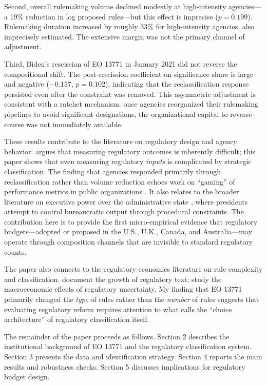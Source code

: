 \documentclass[12pt]{article}
\begin{document}
Second, overall rulemaking volume declined modestly at high-intensity agencies---a 19\% reduction in log proposed rules---but this effect is imprecise ($p = 0.199$). Rulemaking duration increased by roughly 33\% for high-intensity agencies, also imprecisely estimated. The extensive margin was not the primary channel of adjustment.

Third, Biden's rescission of EO 13771 in January 2021 did not reverse the compositional shift. The post-rescission coefficient on significance share is large and negative ($-0.157$, $p = 0.102$), indicating that the reclassification response persisted even after the constraint was removed. This asymmetric adjustment is consistent with a ratchet mechanism: once agencies reorganized their rulemaking pipelines to avoid significant designations, the organizational capital to reverse course was not immediately available.

These results contribute to the literature on regulatory design and agency behavior. \citet{coglianese2002empirical} argues that measuring regulatory outcomes is inherently difficult; this paper shows that even measuring regulatory \textit{inputs} is complicated by strategic classification. The finding that agencies responded primarily through reclassification rather than volume reduction echoes work on ``gaming'' of performance metrics in public organizations \citep{bevan2006gaming}. It also relates to the broader literature on executive power over the administrative state \citep{kagan2001presidential, nou2019domesticating}, where presidents attempt to control bureaucratic output through procedural constraints. The contribution here is to provide the first micro-empirical evidence that regulatory budgets---adopted or proposed in the U.S., U.K., Canada, and Australia---may operate through composition channels that are invisible to standard regulatory counts.

The paper also connects to the regulatory economics literature on rule complexity and classification. \citet{al2012measuring} document the growth of regulatory text; \citet{dawson2018regulation} study the macroeconomic effects of regulatory uncertainty. My finding that EO 13771 primarily changed the \textit{type} of rules rather than the \textit{number} of rules suggests that evaluating regulatory reform requires attention to what \citet{sunstein2013simpler} calls the ``choice architecture'' of regulatory classification itself.

The remainder of the paper proceeds as follows. Section 2 describes the institutional background of EO 13771 and the regulatory classification system. Section 3 presents the data and identification strategy. Section 4 reports the main results and robustness checks. Section 5 discusses implications for regulatory budget design.
\end{document}
